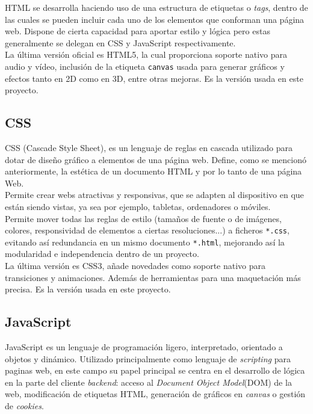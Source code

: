 \documentclass[11pt,a4paper]{book}
\begin{document}
				HTML se desarrolla haciendo uso de una estructura de etiquetas o \textit{tags}, dentro de las cuales se pueden incluir cada uno de los elementos que conforman una página web. Dispone de cierta capacidad para aportar estilo y lógica pero estas generalmente se delegan en CSS y JavaScript respectivamente.\\
				
				La última versión oficial es HTML5, la cual proporciona soporte nativo para audio y vídeo, inclusión de la etiqueta \texttt{canvas} usada para generar gráficos y efectos tanto en 2D como en 3D, entre otras mejoras. Es la versión usada en este proyecto.
				
			\subsection{CSS}
				CSS (Cascade Style Sheet), es un lenguaje de reglas en cascada utilizado para dotar de diseño gráfico a elementos de una página web. Define, como se mencionó anteriormente, la estética de un documento HTML y por lo tanto de una página Web. \\
				
				Permite crear webs atractivas y responsivas, que se adapten al dispositivo en que están siendo vistas, ya sea por ejemplo, tabletas, ordenadores o móviles.\\
				
				Permite mover todas las reglas de estilo (tamaños de fuente o de imágenes, colores, responsividad de elementos a ciertas resoluciones...) a ficheros \texttt{*.css}, evitando así redundancia en un mismo documento \texttt{*.html}, mejorando así la modularidad e independencia dentro de un proyecto.\\
								
				La última versión es CSS3, añade novedades como soporte nativo para transiciones y animaciones. Además de herramientas para una maquetación más precisa. Es la versión usada en este proyecto.
				
			\subsection{JavaScript}
				JavaScript \cite{JavaScript} es un lenguaje de programación ligero, interpretado, orientado a objetos y dinámico. Utilizado principalmente como lenguaje de \textit{scripting} para paginas web, en este campo su papel principal se centra en el desarrollo de lógica en la parte del cliente \textit{backend}: acceso al \textit{Document Object Model}(DOM) de la web, modificación de etiquetas HTML, generación de gráficos en \textit{canvas} o gestión de \textit{cookies}.\\
				
\end{document}
